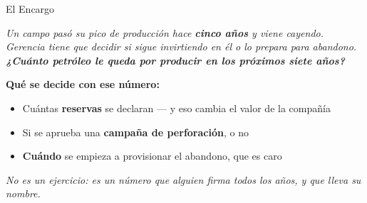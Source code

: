 \documentclass[aspectratio=169, 11pt]{beamer}
\begin{document}
\begin{frame}[shrink=14]{El Encargo}
  \vspace{-2pt}
  \begin{tcolorbox}[colback=arcaGray, colframe=arcaDark, boxrule=0pt, leftrule=3pt,
    arc=3pt, left=8pt, right=8pt, top=7pt, bottom=7pt]
    {\small\color{arcaDark}\itshape
     Un campo pasó su pico de producción hace \textbf{cinco años} y viene
     cayendo. Gerencia tiene que decidir si sigue invirtiendo en él o lo
     prepara para abandono.\\[6pt]
     \textbf{¿Cuánto petróleo le queda por producir en los próximos siete años?}}
  \end{tcolorbox}
  \vspace{10pt}

  {\small\color{arcaDark}\bfseries\faDollarSign\hspace{5pt}Qué se decide con ese número:}
  \vspace{5pt}
  {\footnotesize\color{textMuted}
  \begin{itemize}\setlength{\itemsep}{5pt}
    \item[{\color{arcaRed}\scriptsize\faArrowRight}]
      Cuántas \textbf{reservas} se declaran --- y eso cambia el valor de la compañía
    \item[{\color{arcaRed}\scriptsize\faArrowRight}]
      Si se aprueba una \textbf{campaña de perforación}, o no
    \item[{\color{arcaRed}\scriptsize\faArrowRight}]
      \textbf{Cuándo} se empieza a provisionar el abandono, que es caro
  \end{itemize}}
  \vspace{7pt}
  {\footnotesize\color{arcaDark}\itshape
   No es un ejercicio: es un número que alguien firma todos los años,
   y que lleva su nombre.}
\end{frame}
\end{document}
